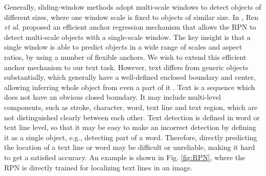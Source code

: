 \documentclass[runningheads]{llncs}
\begin{document}
Generally,  sliding-window methods adopt multi-scale windows to detect objects of different sizes, where one window scale is fixed to objects of similar size. In \cite{Ren2015}, Ren \textit{et al.} proposed an efficient anchor  regression mechanism that allows the RPN to detect multi-scale objects with a single-scale window. The key insight is that a single window is able to predict objects in a wide range
of scales and aspect ratios, by using a number of flexible anchors.  We wish to extend this efficient anchor mechanism to our text task. 
However, text differs from generic objects substantially, which generally have a well-defined enclosed boundary and center, allowing inferring whole object from even a part of it \cite{Cheng2014}.  Text is a sequence which does not have an obvious closed boundary. It may include multi-level components, such as stroke,  character, word, text line and text region, which are not distinguished clearly between each other.  Text detection is defined in word or text line level, so that it may be easy to make an incorrect detection by defining it as  a single object, e.g., detecting part of a word.
Therefore, directly predicting the location of a text line or word may be difficult or unreliable, making it hard to get a satisfied accuracy. An example is shown in Fig. \ref{fig:RPN}, where the RPN is directly trained for localizing text lines in an image.
\end{document}
